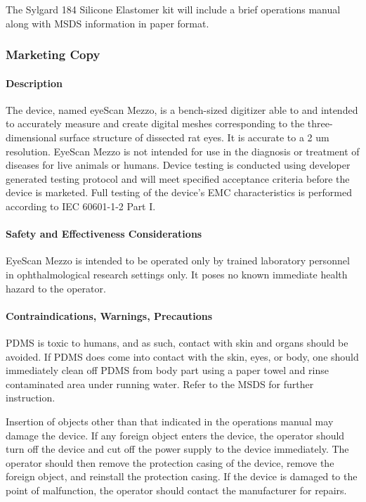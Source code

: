 The Sylgard 184 Silicone Elastomer kit will include a brief operations
manual along with MSDS information in paper format.

\subsubsection{Marketing Copy}

\paragraph{Description}
The device, named eyeScan Mezzo, is a bench-sized digitizer able to  and intended to accurately measure and create digital meshes corresponding to the three-dimensional surface structure of dissected rat eyes. It is accurate to a 2 um resolution. EyeScan Mezzo is not intended for use in the diagnosis or treatment of diseases for live animals or humans. Device testing is conducted using developer generated testing protocol and will meet specified acceptance criteria before the device is marketed. Full testing of the device's EMC characteristics is performed according to IEC 60601-1-2 Part I.

\paragraph{Safety and Effectiveness Considerations}

EyeScan Mezzo is intended to be operated only by trained laboratory personnel in ophthalmological research settings only. It poses no known immediate health hazard to the operator. 

\paragraph{Contraindications, Warnings, Precautions}

PDMS is toxic to humans, and as such, contact with skin and organs should be avoided. If PDMS does come into contact with the skin, eyes, or body, one should immediately clean off PDMS from body part using a paper towel and rinse contaminated area under running water. Refer to the MSDS for further instruction.

Insertion of objects other than that indicated in the operations manual may damage the device.
If any foreign object enters the device, the operator should turn off the device and cut off the power supply to the device immediately. The operator should then remove the protection casing of the device, remove the foreign object, and reinstall the protection casing. If the device is damaged to the point of malfunction, the operator should contact the manufacturer for repairs. 


